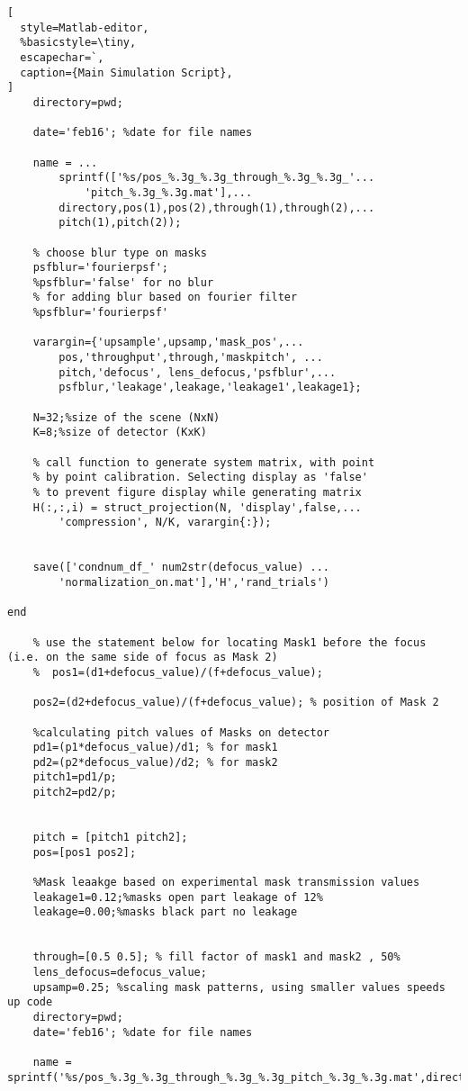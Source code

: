 \begin{lstlisting}[
  style=Matlab-editor,
  %basicstyle=\tiny,
  escapechar=`,
  caption={Main Simulation Script},
]
    directory=pwd;
    
    date='feb16'; %date for file names
    
    name = ...
        sprintf(['%s/pos_%.3g_%.3g_through_%.3g_%.3g_'...
            'pitch_%.3g_%.3g.mat'],...
        directory,pos(1),pos(2),through(1),through(2),...
        pitch(1),pitch(2));
    
    % choose blur type on masks
    psfblur='fourierpsf';
    %psfblur='false' for no blur    
    % for adding blur based on fourier filter    
    %psfblur='fourierpsf' 
    
    varargin={'upsample',upsamp,'mask_pos',...
        pos,'throughput',through,'maskpitch', ...
        pitch,'defocus', lens_defocus,'psfblur',...
        psfblur,'leakage',leakage,'leakage1',leakage1};
    
    N=32;%size of the scene (NxN)
    K=8;%size of detector (KxK)
    
    % call function to generate system matrix, with point 
    % by point calibration. Selecting display as 'false' 
    % to prevent figure display while generating matrix
    H(:,:,i) = struct_projection(N, 'display',false,...
        'compression', N/K, varargin{:});
    

    save(['condnum_df_' num2str(defocus_value) ...
        'normalization_on.mat'],'H','rand_trials')
    
end

    % use the statement below for locating Mask1 before the focus (i.e. on the same side of focus as Mask 2)
    %  pos1=(d1+defocus_value)/(f+defocus_value);
    
    pos2=(d2+defocus_value)/(f+defocus_value); % position of Mask 2
    
    %calculating pitch values of Masks on detector
    pd1=(p1*defocus_value)/d1; % for mask1
    pd2=(p2*defocus_value)/d2; % for mask2
    pitch1=pd1/p;
    pitch2=pd2/p;
    
    
    pitch = [pitch1 pitch2];
    pos=[pos1 pos2];
    
    %Mask leaakge based on experimental mask transmission values
    leakage1=0.12;%masks open part leakage of 12%
    leakage=0.00;%masks black part no leakage
    
    
    through=[0.5 0.5]; % fill factor of mask1 and mask2 , 50%
    lens_defocus=defocus_value;
    upsamp=0.25; %scaling mask patterns, using smaller values speeds up code
    directory=pwd;
    date='feb16'; %date for file names
    
    name = sprintf('%s/pos_%.3g_%.3g_through_%.3g_%.3g_pitch_%.3g_%.3g.mat',directory,pos(1),pos(2),through(1),through(2),pitch(1),pitch(2));
    

\end{lstlisting}
